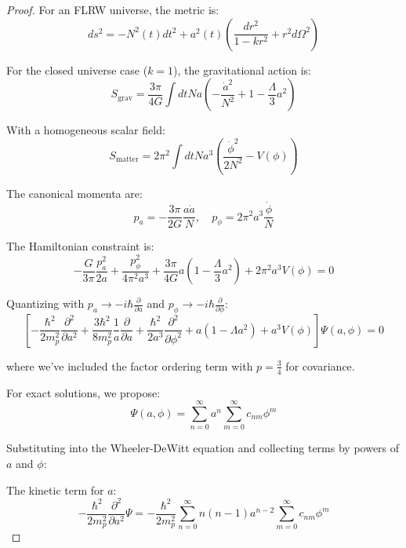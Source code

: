 \documentclass{article}
\begin{document}
\begin{proof}
For an FLRW universe, the metric is:
\begin{equation}
ds^2 = -N^2(t)dt^2 + a^2(t)\left(\frac{dr^2}{1-kr^2} + r^2d\Omega^2\right)
\end{equation}

For the closed universe case ($k=1$), the gravitational action is:
\begin{equation}
S_\text{grav} = \frac{3\pi}{4G}\int dt N a \left(-\frac{\dot{a}^2}{N^2} + 1 - \frac{\Lambda}{3}a^2\right)
\end{equation}

With a homogeneous scalar field:
\begin{equation}
S_\text{matter} = 2\pi^2 \int dt N a^3 \left(\frac{\dot{\phi}^2}{2N^2} - V(\phi)\right)
\end{equation}

The canonical momenta are:
\begin{equation}
p_a = -\frac{3\pi}{2G}\frac{a\dot{a}}{N}, \quad p_\phi = 2\pi^2 a^3 \frac{\dot{\phi}}{N}
\end{equation}

The Hamiltonian constraint is:
\begin{equation}
-\frac{G}{3\pi}\frac{p_a^2}{2a} + \frac{p_\phi^2}{4\pi^2 a^3} + \frac{3\pi}{4G}a\left(1 - \frac{\Lambda}{3}a^2\right) + 2\pi^2 a^3 V(\phi) = 0
\end{equation}

Quantizing with $p_a \to -i\hbar\frac{\partial}{\partial a}$ and $p_\phi \to -i\hbar\frac{\partial}{\partial \phi}$:
\begin{equation}
\left[-\frac{\hbar^2}{2m_p^2}\frac{\partial^2}{\partial a^2} + \frac{3\hbar^2}{8m_p^2}\frac{1}{a}\frac{\partial}{\partial a} + \frac{\hbar^2}{2a^3}\frac{\partial^2}{\partial \phi^2} + a\left(1 - \Lambda a^2\right) + a^3 V(\phi)\right]\Psi(a, \phi) = 0
\end{equation}

where we've included the factor ordering term with $p=\frac{3}{4}$ for covariance.

For exact solutions, we propose:
\begin{equation}
\Psi(a, \phi) = \sum_{n=0}^{\infty}a^n \sum_{m=0}^{\infty}c_{nm}\phi^m
\end{equation}

Substituting into the Wheeler-DeWitt equation and collecting terms by powers of $a$ and $\phi$:

The kinetic term for $a$:
\begin{equation}
-\frac{\hbar^2}{2m_p^2}\frac{\partial^2}{\partial a^2}\Psi = -\frac{\hbar^2}{2m_p^2}\sum_{n=0}^{\infty}n(n-1)a^{n-2}\sum_{m=0}^{\infty}c_{nm}\phi^m
\end{equation}


\end{proof}
\end{document}
